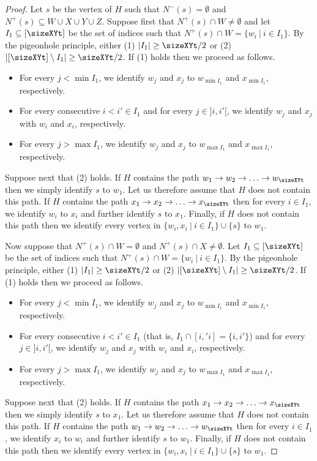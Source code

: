 \documentclass[a4paper,11pt]{article}
\theoremstyle{plain}
\newtheorem{identification rule}{Identification Rule}
\theoremstyle{definition}
\theoremstyle{remark}
\begin{document}
\begin{proof}
Let $s$ be the vertex of $H$ such that $N^-(s) = \emptyset$ and $N^+(s) \subseteq W \cup X \cup Y \cup Z$.
Suppose first that $N^+(s) \cap W \neq \emptyset$ and let $I_1 \subseteq [\sizeXYt]$ be the set of indices such that $N^+(s) \cap W = \{w_i~|~i \in I_1\}$. By the pigeonhole principle, either (1) $|I_1| \geq \sizeXYt/2$ or (2) $|[\sizeXYt] \setminus I_1| \geq \sizeXYt/2$. If (1) holds then we proceed as follows.
\begin{itemize}
\item For every $j < \min I_1$, we identify $w_j$ and $x_j$ to $w_{\min I_1}$ and $x_{\min I_1}$, respectively.
\item For every consecutive $i < i' \in I_1$ and for every $j \in ]i,i'[$, we identify $w_j$ and $x_j$ with $w_i$ and $x_i$, respectively.
\item For every $j > \max I_1$, we identify $w_j$ and $x_j$ to $w_{\max I_1}$ and $x_{\max I_1}$, respectively. 
\end{itemize}
Suppose next that (2) holds. If $H$ contains the path $w_1 \rightarrow w_2 \rightarrow \ldots \rightarrow w_{\sizeXYt}$ then we simply identify $s$ to $w_1$. Let us therefore assume that $H$ does not contain this path. If $H$ contains the path $x_1 \rightarrow x_2 \rightarrow \ldots \rightarrow x_{\sizeXYt}$ then for every $i \in I_1$, we identify $w_i$ to $x_i$ and further identify $s$ to $x_1$.
Finally, if $H$ does not contain this path then we identify every vertex in $\{w_i,x_i~|~i \in I_1\} \cup \{s\}$ to $w_1$.

Now suppose that $N^+(s) \cap W = \emptyset$ and $N^+(s) \cap X \neq \emptyset$. Let $I_1 \subseteq [\sizeXYt]$ be the set of indices such that $N^+(s) \cap W = \{w_i~|~i \in I_1\}$. By the pigeonhole principle, either (1) $|I_1| \geq \sizeXYt/2$ or (2) $|[\sizeXYt] \setminus I_1| \geq \sizeXYt/2$. If (1) holds then we proceed as follows.
\begin{itemize}
\item For every $j < \min I_1$, we identify $w_j$ and $x_j$ to $w_{\min I_1}$ and $x_{\min I_1}$, respectively.
\item For every consecutive $i < i' \in I_1$ (that is, $I_1 \cap [i,'i]= \{i,i'\}$) and for every $j \in ]i,i'[$, we identify $w_j$ and $x_j$ with $w_i$ and $x_i$, respectively.
\item For every $j > \max I_1$, we identify $w_j$ and $x_j$ to $w_{\max I_1}$ and $x_{\max I_1}$, respectively. 
\end{itemize}
Suppose next that (2) holds. If $H$ contains the path $x_1 \rightarrow x_2 \rightarrow \ldots \rightarrow x_{\sizeXYt}$ then we simply identify $s$ to $x_1$. Let us therefore assume that $H$ does not contain this path. If $H$ contains the path $w_1 \rightarrow w_2 \rightarrow \ldots \rightarrow w_{\sizeXYt}$ then for every $i \in I_1$, we identify $x_i$ to $w_i$ and further identify $s$ to $w_1$. Finally, if $H$ does not contain this path then we identify every vertex in $\{w_i,x_i~|~i \in I_1\} \cup \{s\}$ to $w_1$.


\end{proof}
\end{document}
